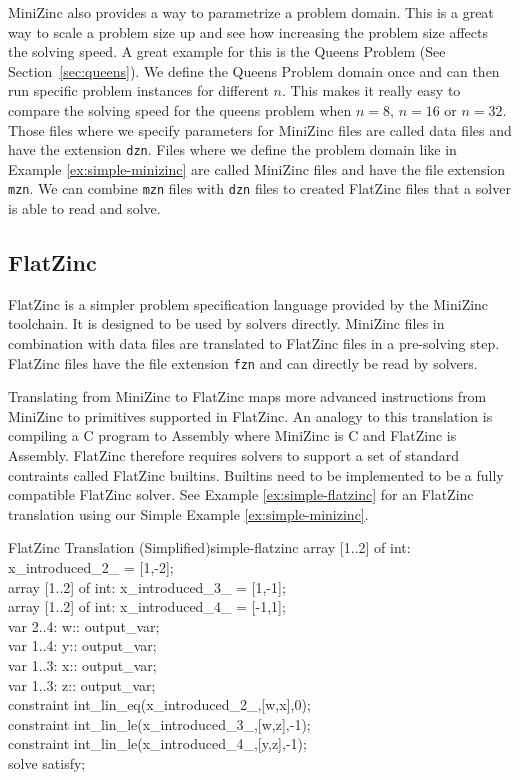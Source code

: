 MiniZinc also provides a way to parametrize a problem domain. This is a great way to scale a problem size up and see how increasing the problem size affects the solving speed. A great example for this is the Queens Problem (See Section~\ref{sec:queens}). We define the Queens Problem domain once and can then run specific problem instances for different $n$. This makes it really easy to compare the solving speed for the queens problem when $n = 8$, $n = 16$ or $n = 32$. Those files where we specify parameters for MiniZinc files are called data files and have the extension \verb|dzn|. Files where we define the problem domain like in Example \ref{ex:simple-minizinc} are called MiniZinc files and have the file extension \verb|mzn|. We can combine \verb|mzn| files with \verb|dzn| files to created FlatZinc files that a solver is able to read and solve.

\subsection{FlatZinc}

FlatZinc is a simpler problem specification language provided by the MiniZinc toolchain. It is designed to be used by solvers directly. MiniZinc files in combination with data files are translated to FlatZinc files in a pre-solving step. FlatZinc files have the file extension \verb|fzn| and can directly be read by solvers.

Translating from MiniZinc to FlatZinc maps more advanced instructions from MiniZinc to primitives supported in FlatZinc. An analogy to this translation is compiling a C program to Assembly where MiniZinc is C and FlatZinc is Assembly. FlatZinc therefore requires solvers to support a set of standard contraints called FlatZinc builtins. Builtins need to be implemented to be a fully compatible FlatZinc solver. See Example \ref{ex:simple-flatzinc} for an FlatZinc translation using our Simple Example \ref{ex:simple-minizinc}.

\begin{example}{FlatZinc Translation (Simplified)}{simple-flatzinc}
	array [1..2] of int: x\_introduced\_2\_ = [1,-2]; \\
	array [1..2] of int: x\_introduced\_3\_ = [1,-1]; \\
	array [1..2] of int: x\_introduced\_4\_ = [-1,1]; \\
	var 2..4: w:: output\_var; \\
	var 1..4: y:: output\_var; \\
	var 1..3: x:: output\_var; \\
	var 1..3: z:: output\_var; \\
	constraint int\_lin\_eq(x\_introduced\_2\_,[w,x],0); \\
	constraint int\_lin\_le(x\_introduced\_3\_,[w,z],-1); \\
	constraint int\_lin\_le(x\_introduced\_4\_,[y,z],-1); \\
	solve  satisfy;
\end{example}

